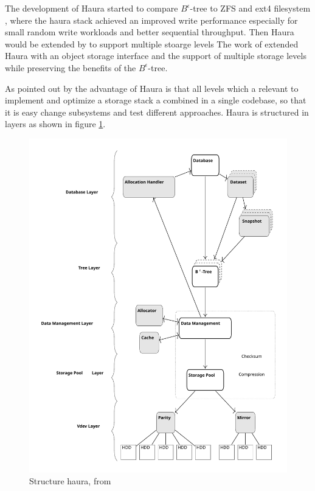 \documentclass[
	12pt,
	a4paper,
	abstract,
	bibliography=totoc,
	chapterprefix,
	headings=openright,
	numbers=endperiod,
	parskip=half,
	twoside,
]{scrreprt}
\begin{document}

The development of Haura started to compare $B^{\epsilon}$-tree to ZFS and ext4 filesystem \cite{wiedemann2018modern}, where the haura stack
achieved an improved write performance especially for small random write workloads and better sequential throughput.
Then Haura would be extended by \cite{hoppner2021design} to support multiple stoarge levels
The work of \cite{hoppner2021design} extended Haura with an object storage interface and the support of multiple storage levels while preserving the benefits of the $B^{\epsilon}$-tree.

As pointed out by \cite{wunsche2022data} the advantage of Haura is that all levels which a relevant to implement and optimize a storage stack a combined in a single codebase, so that it is easy change subsystems and test different approaches.
Haura is structured in layers as shown in figure \ref{fig:structure haura}.

\begin{figure}[ht]
	\centering
	\includegraphics[scale=0.4]{overview_haura_level.pdf}
	\caption{Structure haura, from \cite{wiedemann2018modern}}
		\label{fig:structure haura}
\end{figure}
\end{document}
